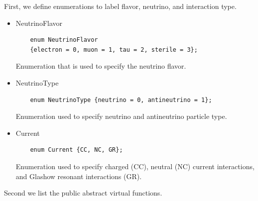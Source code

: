 \documentclass[3p,12pt]{elsarticle}
\newcommand{\ttf}{\ttfamily}
\begin{document}
First, we define enumerations to label flavor, neutrino, and interaction type.
\begin{itemize}
  \item {\ttf NeutrinoFlavor}
  \begin{lstlisting}
    enum NeutrinoFlavor
    {electron = 0, muon = 1, tau = 2, sterile = 3};
 \end{lstlisting}
  Enumeration that is used to specify the neutrino flavor.
  \item {\ttf NeutrinoType}
  \begin{lstlisting}
    enum NeutrinoType {neutrino = 0, antineutrino = 1};
  \end{lstlisting}
  Enumeration used to specify {\ttf neutrino} and {\ttf antineutrino} particle type.
  \item {\ttf Current}
  \begin{lstlisting}
    enum Current {CC, NC, GR};
  \end{lstlisting}
  Enumeration used to specify charged ({\ttf CC}), neutral ({\ttf NC}) current interactions, 
  and Glashow resonant interactions ({\ttf GR}).
\end{itemize}

Second we list the public abstract virtual functions.
\end{document}
